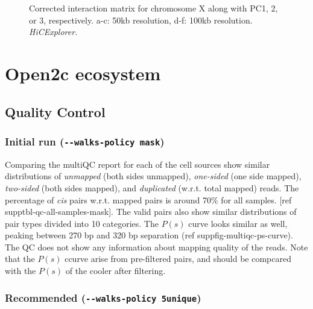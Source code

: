 \documentclass[
  11pt,
  a4paper,
]{scrbook}
\let\oldemph\emph
\renewcommand\emph[1]{\oldemph{\color{gray}#1}}
\begin{document}
\begin{figure}
\begin{minipage}{0.33\linewidth}
{}

\subcaption{\label{fig-explorer-pc3-100kb}}

\end{minipage}%

\caption{\label{fig-explorer-pca}Corrected interaction matrix for
chromosome X along with PC1, 2, or 3, respectively. a-c: 50kb
resolution, d-f: 100kb resolution. \emph{HiCExplorer}.}

\end{figure}%

\section{Open2c ecosystem}\label{open2c-ecosystem}

\subsection{Quality Control}\label{quality-control-1}

\subsubsection{\texorpdfstring{Initial run
(\texttt{-\/-walks-policy\ mask})}{Initial run (-\/-walks-policy mask)}}\label{initial-run---walks-policy-mask}

Comparing the multiQC report for each of the cell sources show similar
distributions of \emph{unmapped} (both sides unmapped), \emph{one-sided}
(one side mapped), \emph{two-sided} (both sides mapped), and
\emph{duplicated} (w.r.t. total mapped) reads. The percentage of
\emph{cis} pairs w.r.t. mapped pairs is around 70\% for all samples.
{[}ref supptbl-qc-all-samples-mask{]}. The valid pairs also show similar
distributions of pair types divided into 10 categories. The \(P(s)\)
curve looks similar as well, peaking between 270 bp and 320 bp
separation (ref suppfig-multiqc-ps-curve). The QC does not show any
information about mapping quality of the reads. Note that the \(P(s)\)
ccurve arise from pre-filtered pairs, and should be compcared with the
\(P(s)\) of the cooler after filtering.

\subsubsection{\texorpdfstring{Recommended
(\texttt{-\/-walks-policy\ 5unique})}{Recommended (-\/-walks-policy 5unique)}}\label{recommended---walks-policy-5unique}
\end{document}
